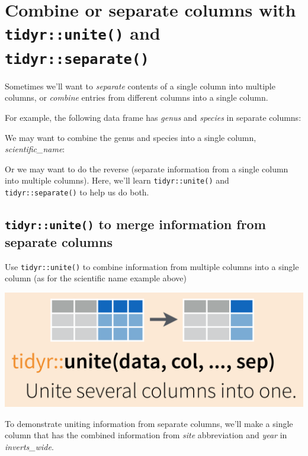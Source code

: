 \documentclass[]{book}
\begin{document}
\hypertarget{combine-or-separate-columns-with-tidyrunite-and-tidyrseparate}{%
\section{\texorpdfstring{Combine or separate columns with \texttt{tidyr::unite()} and \texttt{tidyr::separate()}}{Combine or separate columns with tidyr::unite() and tidyr::separate()}}\label{combine-or-separate-columns-with-tidyrunite-and-tidyrseparate}}

Sometimes we'll want to \emph{separate} contents of a single column into multiple columns, or \emph{combine} entries from different columns into a single column.

For example, the following data frame has \emph{genus} and \emph{species} in separate columns:

We may want to combine the genus and species into a single column, \emph{scientific\_name}:

Or we may want to do the reverse (separate information from a single column into multiple columns). Here, we'll learn \texttt{tidyr::unite()} and \texttt{tidyr::separate()} to help us do both.

\hypertarget{tidyrunite-to-merge-information-from-separate-columns}{%
\subsection{\texorpdfstring{\texttt{tidyr::unite()} to merge information from separate columns}{tidyr::unite() to merge information from separate columns}}\label{tidyrunite-to-merge-information-from-separate-columns}}

Use \texttt{tidyr::unite()} to combine information from multiple columns into a single column (as for the scientific name example above)

\includegraphics{img/rstudio-cheatsheet-unite.png}

To demonstrate uniting information from separate columns, we'll make a single column that has the combined information from \emph{site} abbreviation and \emph{year} in \emph{inverts\_wide}.
\end{document}
